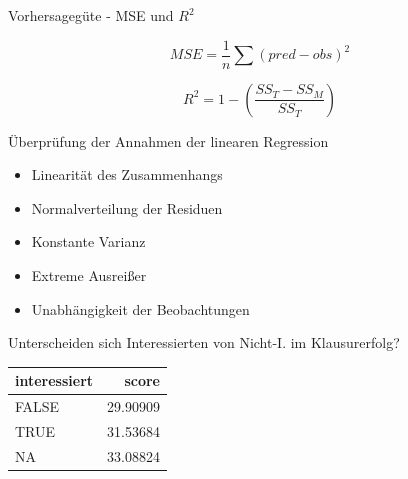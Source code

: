 \begin{frame}{Vorhersagegüte - MSE und \(R^2\)}

\[ MSE = \frac{1}{n} \sum{(pred - obs)^2} \]

\[ R^2 = 1 - \left( \frac{SS_T - SS_M}{SS_T} \right)\]

\end{frame}

\begin{frame}{Überprüfung der Annahmen der linearen Regression}

\begin{itemize}
\tightlist
\item
  Linearität des Zusammenhangs
\item
  Normalverteilung der Residuen
\item
  Konstante Varianz
\item
  Extreme Ausreißer
\item
  Unabhängigkeit der Beobachtungen
\end{itemize}

\end{frame}

\begin{frame}{Unterscheiden sich Interessierten von Nicht-I. im
Klausurerfolg?}

\begin{longtable}[]{@{}lr@{}}
\toprule
interessiert & score\tabularnewline
\midrule
\endhead
FALSE & 29.90909\tabularnewline
TRUE & 31.53684\tabularnewline
NA & 33.08824\tabularnewline
\bottomrule
\end{longtable}

\end{frame}

